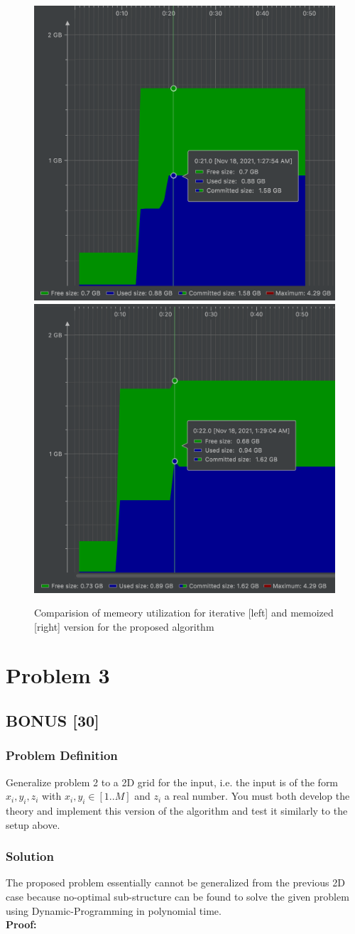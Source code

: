 \documentclass{article}
\begin{document}
\begin{figure}[ht]
    \centering
    \includegraphics[width=.45\textwidth,height=.20\textheight]{Iterative.png}
    \includegraphics[width=.45\textwidth,height=.20\textheight]{Recursive.png}
    \caption{Comparision of memeory utilization for iterative [left] and memoized [right] version for the proposed algorithm}
    \label{fig:rec_itr}
\end{figure}




\clearpage
\section*{Problem 3}
\subsection*{BONUS [30]} 
\subsubsection*{Problem Definition}
Generalize problem 2 to a 2D grid for the input, i.e. the input is of the form $x_i,y_i,z_i$ with $x_i,y_i\in[1..M]$ and $z_i$ a real number. You must both develop the theory and implement this version of the algorithm and test it similarly to the setup above.
\subsubsection*{Solution}
The proposed problem essentially cannot be generalized from the previous 2D case because no-optimal sub-structure can be found to solve the given problem using Dynamic-Programming in polynomial time.\\
\textbf{Proof: } 
\end{document}
